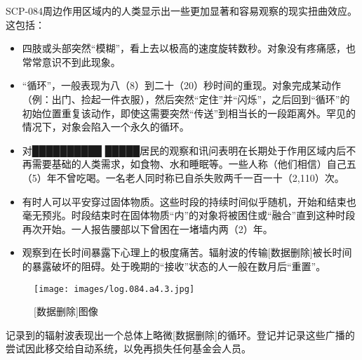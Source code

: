 \hr

SCP-084周边作用区域内的人类显示出一些更加显著和容易观察的现实扭曲效应。这包括：

\begin{itemize}
\item 四肢或头部突然“模糊”，看上去以极高的速度旋转数秒。对象没有疼痛感，也常常意识不到此现象。
\item “循环”，一般表现为八（8）到二十（20）秒时间的重现。对象完成某动作（例：出门、捡起一件衣服），然后突然“定住”并“闪烁”，之后回到“循环”的初始位置重复该动作，即使这需要突然“传送”到相当长的一段距离外。罕见的情况下，对象会陷入一个永久的循环。
\item 对██████████ █████居民的观察和讯问表明在长期处于作用区域内后不再需要基础的人类需求，如食物、水和睡眠等。一些人称（他们相信）自己五（5）年不曾吃喝。一名老人同时称已自杀失败两千一百一十（2,110）次。
\item 有时人可以平安穿过固体物质。这些时段的持续时间似乎随机，开始和结束也毫无预兆。时段结束时在固体物质“内”的对象将被困住或“融合”直到这种时段再次开始。一人报告腰部以下曾困在一堵墙内两（2）年。
\item 观察到在长时间暴露下心理上的极度痛苦。辐射波的传输{[}数据删除]被长时间的暴露破坏的阻碍。处于晚期的“接收”状态的人一般在数月后“重置”。
\end{itemize}

\begin{figure}[H]
    \centering
    \texttt{[image: images/log.084.a4.3.jpg]}
    \caption*{{[}数据删除]图像}
\end{figure}

\hr

记录到的辐射波表现出一个总体上略微{[}数据删除]的循环。登记并记录这些广播的尝试因此移交给自动系统，以免再损失任何基金会人员。
